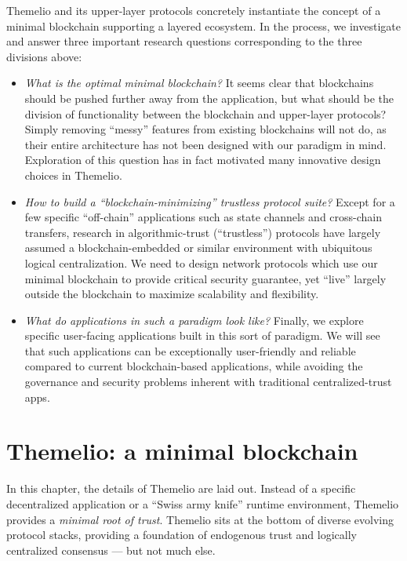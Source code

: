 \documentclass[headinclude,12pt]{scrbook}
\begin{document}
Themelio and its upper-layer protocols concretely instantiate the concept of a minimal blockchain supporting a layered ecosystem. In the process, we investigate and answer three important research questions corresponding to the three divisions above:

\begin{itemize}
    \item \textit{What is the optimal minimal blockchain?} It seems clear that blockchains should be pushed further away from the application, but what should be the division of functionality between the blockchain and upper-layer protocols? Simply removing ``messy'' features from existing blockchains will not do, as their entire architecture has not been designed with our paradigm in mind. Exploration of this question has in fact motivated many innovative design choices in Themelio.
    \item \textit{How to build a ``blockchain-minimizing'' trustless protocol suite?} Except for a few specific ``off-chain'' applications such as state channels and cross-chain transfers, research in algorithmic-trust (``trustless'') protocols have largely assumed a blockchain-embedded or similar environment with ubiquitous logical centralization. We need to design network protocols which use our minimal blockchain to provide critical security guarantee, yet ``live'' largely outside the blockchain to maximize scalability and flexibility.
    \item \textit{What do applications in such a paradigm look like?} Finally, we explore specific user-facing applications built in this sort of paradigm. We will see that such applications can be exceptionally user-friendly and reliable compared to current blockchain-based applications, while avoiding the governance and security problems inherent with traditional centralized-trust apps.
\end{itemize}


\chapter{Themelio: a minimal blockchain}

In this chapter, the details of Themelio are laid out. Instead of a specific decentralized application or a ``Swiss army knife'' runtime environment, Themelio provides a \emph{minimal root of trust}. Themelio sits at the bottom of diverse evolving protocol stacks, providing a foundation of endogenous trust and logically centralized consensus --- but not much else.
\end{document}
